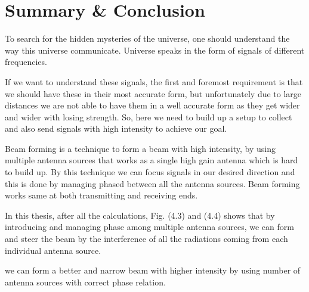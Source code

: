 \chapter{Summary \& Conclusion}

To search for the hidden mysteries of the universe, one should understand the way this universe communicate. Universe speaks in the form of signals of different frequencies.

If we want to understand these signals, the first and foremost requirement is that we should have these in their most accurate form, but unfortunately due to large distances we are not able to have them in a well accurate form as they get wider and wider with losing strength. So, here we need to build up a setup to collect and also send signals with high intensity to achieve our goal.

Beam forming is a technique to form a beam with high intensity, by using multiple antenna sources that works as a single high gain antenna which is hard to build up. By this technique we can focus signals in our desired direction and this is done by managing phased between all the antenna sources. Beam forming works same at both transmitting and receiving ends.

In this thesis, after all the calculations, Fig. (4.3) and (4.4) shows that by introducing and managing phase among multiple antenna sources, we can form and steer the beam by the interference of all the radiations coming from each individual antenna source.

we can form a better and narrow beam with higher intensity by using number of antenna sources with correct phase relation.

